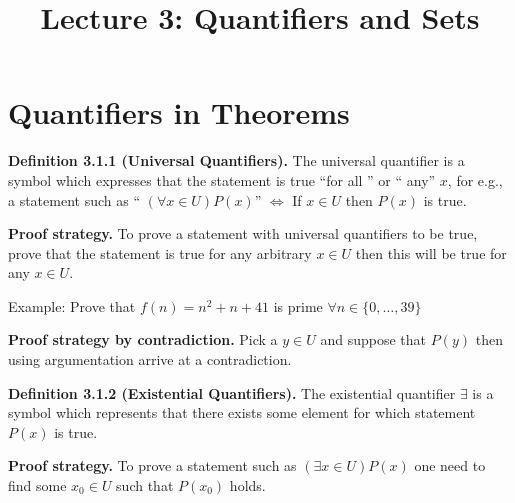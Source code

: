 \documentclass[a4paper,10pt]{article}
\title{ Lecture 3: Quantifiers and Sets}
\begin{document}
\maketitle
\section{ Quantifiers in Theorems}
\textbf{Definition 3.1.1 (Universal Quantifiers).} The universal quantifier is a symbol which expresses that the statement is true  ``for all '' or `` any'' $x$, for e.g., a statement such as `` $(\forall x\in U)P(x)$'' $\Longleftrightarrow$ If $x\in U$ then $P(x)$ is true.  

\textbf{Proof strategy.} To prove a statement with universal quantifiers to be true, prove that the statement is true for any arbitrary $x \in U$ then this will be true for any $x\in U$. 

Example: Prove that $f(n) = n^2+n+41$ is prime $\forall n\in\{0,\ldots, 39\}$ 

\textbf{Proof strategy by contradiction.} Pick a $y\in U$ and suppose that $P(y)$ then using argumentation arrive at a contradiction.

\textbf{Definition 3.1.2 (Existential Quantifiers).} The existential quantifier $\exists$ is a symbol which represents that there exists some element for which statement $P(x)$ is true. 

\textbf{Proof strategy.} To prove a statement such as \emph{$(\exists x \in U)P(x) $} one need to find some $x_0\in U$ such that $P(x_0)$ holds.
\end{document}
